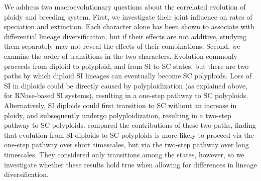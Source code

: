 We address two macroevolutionary questions about the correlated evolution of ploidy and breeding system.
First, we investigate their joint influence on rates of speciation and extinction.
Each character alone has been shown to associate with differential lineage diversification, but if their effects are not additive, studying them separately may not reveal the effects of their combinations.
Second, we examine the order of transitions in the two characters.
Evolution commonly proceeds from diploid to polyploid, and from SI to SC states, but there are two paths by which diploid SI lineages can eventually become SC polyploids.
Loss of SI in diploids could be directly caused by polyploidization (as explained above, for RNase-based SI systems), resulting in a one-step pathway to SC polyploids. 
Alternatively, SI diploids could first transition to SC without an increase in ploidy, and subsequently undergo polyploidization, resulting in a two-step pathway to SC polyploids.
\citet{robertson_2011} compared the contributions of these two paths, finding that evolution from SI diploids to SC polyploids is more likely to proceed via the one-step pathway over short timescales, but via the two-step pathway over long timescales.
They considered only transitions among the states, however, so we investigate whether these results hold true when allowing for differences in lineage diversification.

